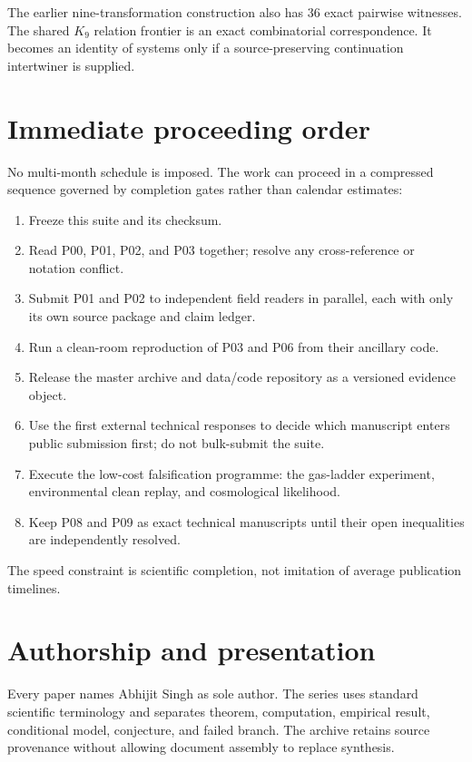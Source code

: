 \documentclass[11pt,a4paper]{article}
\begin{document}
The earlier nine-transformation construction also has 36 exact pairwise witnesses. The shared $K_9$ relation frontier is an exact combinatorial correspondence. It becomes an identity of systems only if a source-preserving continuation intertwiner is supplied.

\section{Immediate proceeding order}
No multi-month schedule is imposed. The work can proceed in a compressed sequence governed by completion gates rather than calendar estimates:
\begin{enumerate}
\item Freeze this suite and its checksum.
\item Read P00, P01, P02, and P03 together; resolve any cross-reference or notation conflict.
\item Submit P01 and P02 to independent field readers in parallel, each with only its own source package and claim ledger.
\item Run a clean-room reproduction of P03 and P06 from their ancillary code.
\item Release the master archive and data/code repository as a versioned evidence object.
\item Use the first external technical responses to decide which manuscript enters public submission first; do not bulk-submit the suite.
\item Execute the low-cost falsification programme: the gas-ladder experiment, environmental clean replay, and cosmological likelihood.
\item Keep P08 and P09 as exact technical manuscripts until their open inequalities are independently resolved.
\end{enumerate}
The speed constraint is scientific completion, not imitation of average publication timelines.

\section{Authorship and presentation}
Every paper names Abhijit Singh as sole author. The series uses standard scientific terminology and separates theorem, computation, empirical result, conditional model, conjecture, and failed branch. The archive retains source provenance without allowing document assembly to replace synthesis.
\end{document}
